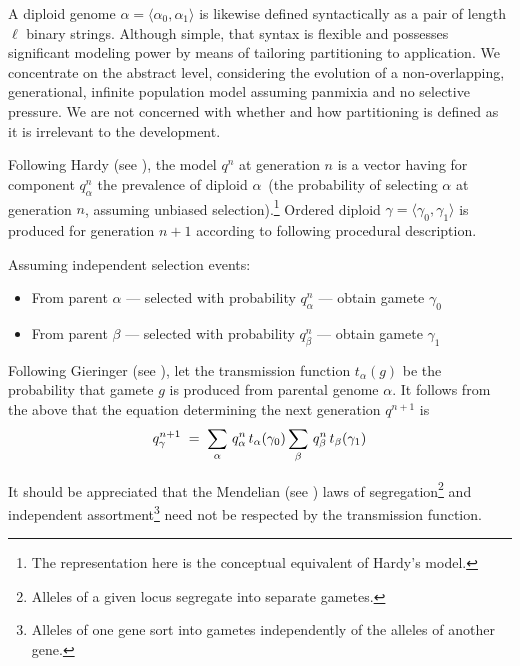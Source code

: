 A diploid genome $\alpha = \langle \alpha_0, \alpha_1 \rangle$ is
likewise defined syntactically as a pair of length $\ell$ binary
strings.  Although simple, that syntax is flexible and possesses
significant modeling power by means of tailoring partitioning to
application.  We concentrate on the abstract level, considering the
evolution of a non-overlapping, generational, infinite population
model assuming panmixia and no selective pressure. We are not concerned with 
whether and how partitioning is defined as it is irrelevant 
to the development.

Following Hardy (see \cite{Hardy1908}), the model $q^{n}$ at generation $n$
is a vector having for component $q_\alpha^n$ the prevalence of
diploid $\alpha\,$ (the probability of selecting $\alpha$ \nudge at
generation $n$, assuming unbiased selection).\footnote{The
  representation here is the conceptual equivalent of Hardy's model.}
Ordered diploid $\gamma = \langle \gamma_0, \gamma_1 \rangle$ is
produced for generation $n+1$ according to following procedural
description.

  Assuming independent selection events:
\begin{itemize}
\item From parent $\alpha$ --- selected with probability
  $q_\alpha^n$ --- obtain gamete $\gamma_0$
\item From parent $\beta$ --- selected with probability $q_\beta^n$
  --- obtain gamete $\gamma_1$
\end{itemize}
Following Gieringer (see \cite{Geiringer1944}), let the transmission
function $t_\alpha(g)$ be the probability that gamete $g$ is produced
from parental genome $\alpha$.  It follows from the above that the
equation determining the next generation $q^{n+1}$ is
\begin{equation}
\label{model0}
q_\gamma^{n+1} \; = \;
\sum_{\alpha} \, q_\alpha^n \, t_\alpha(\gamma_0) 
\sum_{\beta} \,q_\beta^n \, t_\beta(\gamma_1)\\[-.05in]
\end{equation}

It should be appreciated that the Mendelian (see \cite{Mendel1866}) laws of
segregation\footnote{Alleles of a given locus segregate into separate
  gametes.} and independent assortment\footnote{Alleles of one gene
  sort into gametes independently of the alleles of another gene.}
need not be respected by the transmission function.


